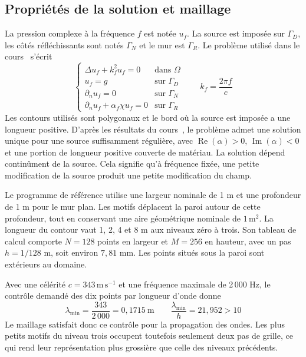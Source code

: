 \documentclass[11pt,a4paper]{article}
\begin{document}
\subsection{Propriétés de la solution et maillage}
\label{sec:modele}
La pression complexe à la fréquence $f$ est notée $u_f$. La source est imposée sur $\Gamma_D$, les côtés réfléchissants sont notés $\Gamma_N$ et le mur est $\Gamma_R$. Le problème utilisé dans le cours~\cite{cours} s'écrit
\begin{equation*}
\begin{cases}
\Delta u_f+k_f^2u_f=0 & \text{dans }\Omega\\
u_f=g & \text{sur }\Gamma_D\\
\partial_nu_f=0 & \text{sur }\Gamma_N\\
\partial_nu_f+\alpha_f\chi u_f=0 & \text{sur }\Gamma_R
\end{cases}
\qquad k_f=\frac{2\pi f}{c}
\end{equation*}
Les contours utilisés sont polygonaux et le bord où la source est imposée a une longueur positive. D'après les résultats du cours~\cite{cours}, le problème admet une solution unique pour une source suffisamment régulière, avec $\operatorname{Re}(\alpha)>0$, $\operatorname{Im}(\alpha)<0$ et une portion de longueur positive couverte de matériau. La solution dépend continûment de la source. Cela signifie qu'à fréquence fixée, une petite modification de la source produit une petite modification du champ.

Le programme de référence utilise une largeur nominale de 1 m et une profondeur de 1 m pour le mur plan. Les motifs déplacent la paroi autour de cette profondeur, tout en conservant une aire géométrique nominale de $1\,\mathrm{m^2}$. La longueur du contour vaut 1, 2, 4 et 8 m aux niveaux zéro à trois. Son tableau de calcul comporte $N=128$ points en largeur et $M=256$ en hauteur, avec un pas $h=1/128$ m, soit environ $7{,}81$ mm. Les points situés sous la paroi sont extérieurs au domaine.

Avec une célérité $c=343\,\mathrm{m\,s^{-1}}$ et une fréquence maximale de 2\,000 Hz, le contrôle demandé des dix points par longueur d'onde donne
\begin{equation*}
\lambda_{\min}=\frac{343}{2\,000}=0{,}1715\ \mathrm m
\qquad
\frac{\lambda_{\min}}{h}=21{,}952>10
\end{equation*}
Le maillage satisfait donc ce contrôle pour la propagation des ondes. Les plus petits motifs du niveau trois occupent toutefois seulement deux pas de grille, ce qui rend leur représentation plus grossière que celle des niveaux précédents.
\end{document}
